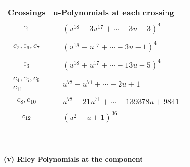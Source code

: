 \documentclass[1p]{elsarticle_modified}
\theoremstyle{definition}
\begin{document}
\begin{tabular}{m{50pt}|m{274pt}}
Crossings & \hspace{64pt}u-Polynomials at each crossing \\
\hline $$\begin{aligned}c_{1}\end{aligned}$$&$\begin{aligned}
&(u^{18}-3 u^{17}+\cdots-3 u+3)^{4}
\end{aligned}$\\
\hline $$\begin{aligned}c_{2},c_{6},c_{7}\end{aligned}$$&$\begin{aligned}
&(u^{18}- u^{17}+\cdots+3 u-1)^{4}
\end{aligned}$\\
\hline $$\begin{aligned}c_{3}\end{aligned}$$&$\begin{aligned}
&(u^{18}+u^{17}+\cdots+13 u-5)^{4}
\end{aligned}$\\
\hline $$\begin{aligned}c_{4},c_{5},c_{9}\\c_{11}\end{aligned}$$&$\begin{aligned}
&u^{72}- u^{71}+\cdots-2 u+1
\end{aligned}$\\
\hline $$\begin{aligned}c_{8},c_{10}\end{aligned}$$&$\begin{aligned}
&u^{72}-21 u^{71}+\cdots-139378 u+9841
\end{aligned}$\\
\hline $$\begin{aligned}c_{12}\end{aligned}$$&$\begin{aligned}
&(u^2- u+1)^{36}
\end{aligned}$\\
\hline
\end{tabular}\\~\\
\newpage\renewcommand{\arraystretch}{1}
\flushleft \textbf{(v) Riley Polynomials at the component}\newline \\
\end{document}
